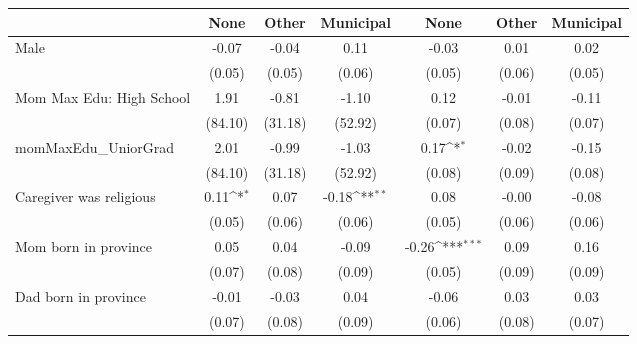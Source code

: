 {
\def\sym#1{\ifmmode^{#1}\else\(^{#1}\)\fi}
\begin{tabular}{l*{6}{c}}
\toprule
                    &\multicolumn{1}{c}{None}&\multicolumn{1}{c}{Other}&\multicolumn{1}{c}{Municipal}&\multicolumn{1}{c}{None}&\multicolumn{1}{c}{Other}&\multicolumn{1}{c}{Municipal}\\
\midrule
Male                &       -0.07         &       -0.04         &        0.11         &       -0.03         &        0.01         &        0.02         \\
                    &      (0.05)         &      (0.05)         &      (0.06)         &      (0.05)         &      (0.06)         &      (0.05)         \\
\addlinespace
Mom Max Edu: High School&        1.91         &       -0.81         &       -1.10         &        0.12         &       -0.01         &       -0.11         \\
                    &     (84.10)         &     (31.18)         &     (52.92)         &      (0.07)         &      (0.08)         &      (0.07)         \\
\addlinespace
momMaxEdu\_UniorGrad &        2.01         &       -0.99         &       -1.03         &        0.17\sym{*}  &       -0.02         &       -0.15         \\
                    &     (84.10)         &     (31.18)         &     (52.92)         &      (0.08)         &      (0.09)         &      (0.08)         \\
\addlinespace
Caregiver was religious&        0.11\sym{*}  &        0.07         &       -0.18\sym{**} &        0.08         &       -0.00         &       -0.08         \\
                    &      (0.05)         &      (0.06)         &      (0.06)         &      (0.05)         &      (0.06)         &      (0.06)         \\
\addlinespace
Mom born in province&        0.05         &        0.04         &       -0.09         &       -0.26\sym{***}&        0.09         &        0.16         \\
                    &      (0.07)         &      (0.08)         &      (0.09)         &      (0.05)         &      (0.09)         &      (0.09)         \\
\addlinespace
Dad born in province&       -0.01         &       -0.03         &        0.04         &       -0.06         &        0.03         &        0.03         \\
                    &      (0.07)         &      (0.08)         &      (0.09)         &      (0.06)         &      (0.08)         &      (0.07)         \\

\end{tabular}}
